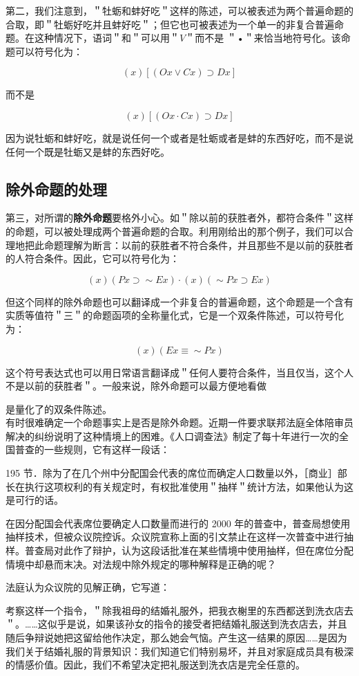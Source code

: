 第二，我们注意到，＂牡蛎和蚌好吃＂这样的陈述，可以被表述为两个普遍命题的合取，即＂牡蛎好吃并且蚌好吃＂；但它也可被表述为一个单一的非复合普遍命题。在这种情况下，语词＂和＂可以用＂$V$＂而不是 ＂•＂来恰当地符号化。该命题可以符号化为：

$$
(x)[(O x \vee C x) \supset D x]
$$

而不是

$$
(x)[(O x \cdot C x) \supset D x]
$$

因为说牡蛎和蚌好吃，就是说任何一个或者是牡蛎或者是蚌的东西好吃，而不是说任何一个既是牡蛎又是蚌的东西好吃。

\subsection{除外命题的处理}

第三，对所谓的\textbf{除外命题}要格外小心。如＂除以前的获胜者外，都符合条件＂这样的命题，可以被处理成两个普遍命题的合取。利用刚给出的那个例子，我们可以合理地把此命题理解为断言：以前的获胜者不符合条件，并且那些不是以前的获胜者的人符合条件。因此，它可以符号化为：

$$
(x)(P x \supset \sim E x) \cdot(x)(\sim P x \supset E x)
$$

但这个同样的除外命题也可以翻译成一个非复合的普遍命题，这个命题是一个含有实质等值符＂三＂的命题函项的全称量化式，它是一个双条件陈述，可以符号化为：

$$
(x)(E x \equiv \sim P x)
$$

这个符号表达式也可以用日常语言翻译成＂任何人要符合条件，当且仅当，这个人不是以前的获胜者＂。一般来说，除外命题可以最方便地看做

是量化了的双条件陈述。\\
有时很难确定一个命题事实上是否是除外命题。近期一件要求联邦法庭全体陪审员解决的纠纷说明了这种情境上的困难。《人口调查法》制定了每十年进行一次的全国普查的一些规则，它有这样一段话：

195 节．除为了在几个州中分配国会代表的席位而确定人口数量以外，［商业］部长在执行这项权利的有关规定时，有权批准使用＂抽样＂统计方法，如果他认为这是可行的话。

在因分配国会代表席位要确定人口数量而进行的 2000 年的普查中，普查局想使用抽样技术，但被众议院控诉。众议院宣称上面的引文禁止在这样一次普查中进行抽样。普查局对此作了辩护，认为这段话批准在某些情境中使用抽样，但在席位分配情境中却悬而末决。对法规中除外规定的哪种解释是正确的呢？

法庭认为众议院的见解正确，它写道：

考察这样一个指令，＂除我祖母的结婚礼服外，把我衣榭里的东西都送到洗衣店去＂。……这似乎是说，如果该孙女的指令的接受者把结婚礼服送到洗衣店去，并且随后争辩说她把这留给他作决定，那么她会气恼。产生这一结果的原因……是因为我们关于结婚礼服的背景知识：我们知道它们特别易坏，并且对家庭成员具有极深的情感价值。因此，我们不希望决定把礼服送到洗衣店是完全任意的。

